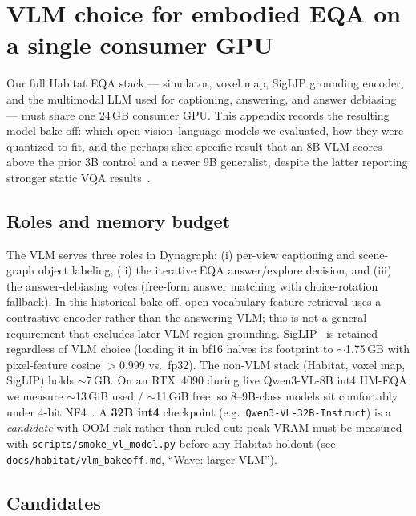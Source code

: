 \section{VLM choice for embodied EQA on a single consumer GPU}
\label{app:model_choice}

Our full Habitat EQA stack --- simulator, voxel map, SigLIP grounding encoder, and the
multimodal LLM used for captioning, answering, and answer debiasing --- must share one
24\,GB consumer GPU. This appendix records the resulting model bake-off: which open
vision--language models we evaluated, how they were quantized to fit, and the perhaps
slice-specific result that an 8B VLM
scores above the prior 3B control and a newer 9B generalist, despite the latter
reporting stronger static VQA results~\citep{qwen35}.

\subsection{Roles and memory budget}

The VLM serves three roles in Dynagraph: (i) per-view captioning and scene-graph object
labeling, (ii) the iterative EQA answer/explore decision, and (iii) the answer-debiasing
votes (free-form answer matching with choice-rotation fallback). In this historical bake-off, open-vocabulary feature retrieval uses a
contrastive encoder rather than the answering VLM; this is not a general
requirement that excludes later VLM-region grounding. SigLIP~\citep{zhai2023siglip} is retained regardless of VLM choice (loading
it in bf16 halves its footprint to $\sim$1.75\,GB with pixel-feature cosine $>$0.999 vs.\
fp32). The non-VLM stack (Habitat, voxel map, SigLIP) holds $\sim$7\,GB.
On an RTX~4090 during live Qwen3-VL-8B int4 HM-EQA we measure $\sim$13\,GiB used / $\sim$11\,GiB free, so 8--9B-class models sit comfortably under 4-bit NF4~\citep{dettmers2023qlora}.
A \textbf{32B int4} checkpoint (e.g.\ \texttt{Qwen3-VL-32B-Instruct}) is a \emph{candidate} with OOM risk rather than ruled out: peak VRAM must be measured with \texttt{scripts/smoke\_vl\_model.py} before any Habitat holdout (see \texttt{docs/habitat/vlm\_bakeoff.md}, ``Wave: larger VLM'').

\subsection{Candidates}

